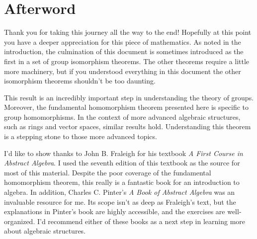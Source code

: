 \section*{Afterword}
\markright{}

Thank you for taking this journey all the way to the end! Hopefully at this point you have a deeper appreciation for this piece of mathematics. As noted in the introduction, the culmination of this document is sometimes introduced as the first in a set of group isomorphism theorems. The other theorems require a little more machinery, but if you understood everything in this document the other isomorphism theorems shouldn't be too daunting.

This result is an incredibly important step in understanding the theory of groups. Moreover, the fundamental homomorphism theorem presented here is specific to group homomorphisms. In the context of more advanced algebraic structures, such as rings and vector spaces, similar results hold. Understanding this theorem is a stepping stone to those more advanced topics.

I'd like to show thanks to John B. Fraleigh for his textbook \textit{A First Course in Abstract Algebra}. I used the seventh edition of this textbook as the source for most of this material. Despite the poor coverage of the fundamental homomorphism theorem, this really is a fantastic book for an introduction to algebra. In addition, Charles C. Pinter's \textit{A Book of Abstract Algebra} was an invaluable resource for me. Its scope isn't as deep as Fraleigh's text, but the explanations in Pinter's book are highly accessible, and the exercises are well-organized. I'd recommend either of these books as a next step in learning more about algebraic structures.